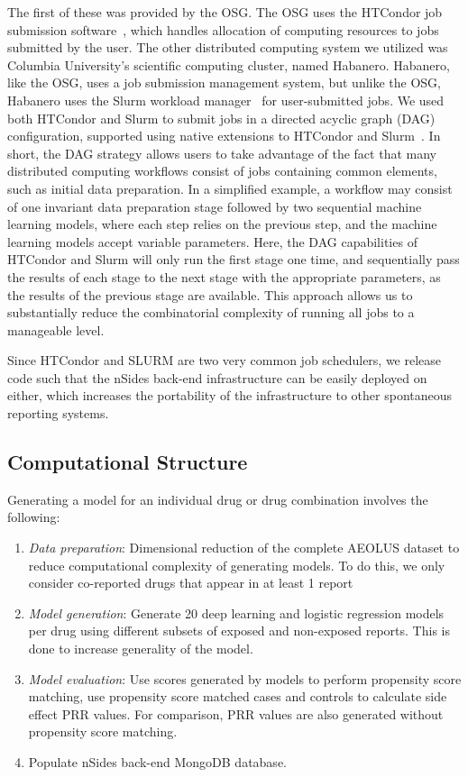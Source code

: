 \documentclass{ws-procs11x85}
\begin{document}
The first of these was provided by the OSG. The OSG uses the HTCondor job submission
software~\cite{beowulfbook-condor}, which handles allocation of
computing resources to jobs submitted by the user. The other
distributed computing system we utilized was Columbia University's
scientific computing cluster, named Habanero. Habanero, like the OSG,
uses a job submission management system, but unlike the OSG, Habanero
uses the Slurm workload manager~\cite{slurm} for user-submitted
jobs. We used both HTCondor and Slurm to submit jobs in a directed
acyclic graph (DAG) configuration, supported using native extensions
to HTCondor and Slurm~\cite{dagman}. In short, the DAG strategy allows
users to take advantage of the fact that many distributed computing
workflows consist of jobs containing common elements, such as initial
data preparation. In a simplified example, a workflow may consist of
one invariant data preparation stage followed by two sequential
machine learning models, where each step relies on the previous step,
and the machine learning models accept variable parameters. Here, the
DAG capabilities of HTCondor and Slurm will only run the first stage
one time, and sequentially pass the results of each stage to the next
stage with the appropriate parameters, as the results of the previous
stage are available. This approach allows us to substantially reduce
the combinatorial complexity of running all jobs to a manageable
level.

Since HTCondor and SLURM are two very common job schedulers, we
release code such that the nSides back-end infrastructure can be
easily deployed on either, which increases the portability of
the infrastructure to other spontaneous reporting systems.

\subsection{Computational Structure}
Generating a model for an individual drug or drug combination involves the following:

\begin{enumerate}
\item {\it Data preparation}: Dimensional reduction of the complete AEOLUS dataset to reduce computational complexity of generating models. To do this, we only consider co-reported drugs that appear in at least 1 report
\item {\it Model generation}: Generate 20 deep learning and logistic regression models per drug using different subsets of exposed and non-exposed reports. This is done to increase generality of the model.
\item {\it Model evaluation}: Use scores generated by models to perform propensity score matching, use propensity score matched cases and controls to calculate side effect PRR values. For comparison, PRR values are also generated without propensity score matching.
\item Populate nSides back-end MongoDB database.
\end{enumerate}
\end{document}
